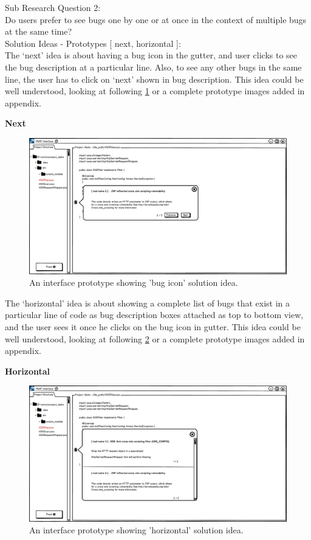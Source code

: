 Sub Research Question 2: \\

Do users prefer to see bugs one by one or at once in the context of multiple bugs at the same time? \\

Solution Ideas - Prototypes [ next, horizontal ]: \\

The ‘next’ idea is about having a bug icon in the gutter, and user clicks to see the bug description at a particular line. Also, to see any other bugs in the same line, the user has to click on ‘next’ shown in bug description. This idea could be well understood, looking at following \ref{fig:S31_next} or a complete prototype images added in appendix.

\textbf{Next}
\begin{figure}[hbt!]
	\centering
	\includegraphics[width=\linewidth]{figures/solution_ideas_snaps/S31_next}
	\caption{An interface prototype showing 'bug icon' solution idea.}
	\label{fig:S31_next}
\end{figure} 

The ‘horizontal’ idea is about showing a complete list of bugs that exist in a particular line of code as bug description boxes attached as top to bottom view, and the user sees it once he clicks on the bug icon in gutter. This idea could be well understood, looking at following \ref{fig:S31_horizontal} or a complete prototype images added in appendix.

\textbf{Horizontal}
\begin{figure}[hbt!]
	\centering
	\includegraphics[width=\linewidth]{figures/solution_ideas_snaps/S31_horizontal}
	\caption{An interface prototype showing 'horizontal' solution idea.}
	\label{fig:S31_horizontal}
\end{figure} 

